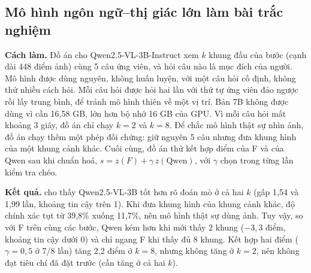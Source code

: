 \documentclass[a4paper,oneside]{report}
\begin{document}
\subsection{Mô hình ngôn ngữ--thị giác lớn làm bài trắc nghiệm}

\textbf{Cách làm.} Đồ án cho Qwen2.5-VL-3B-Instruct \citep{bai2025qwen25vl} xem $k$ khung đầu của bước (cạnh dài 448 điểm ảnh) cùng 5 câu ứng viên, và hỏi câu nào là mục đích của người. Mô hình được dùng nguyên, không huấn luyện, với một câu hỏi cố định, không thử nhiều cách hỏi. Mỗi câu hỏi được hỏi hai lần với thứ tự ứng viên đảo ngược rồi lấy trung bình, để tránh mô hình thiên về một vị trí. Bản 7B không được dùng vì cần 16,58 GB, lớn hơn bộ nhớ 16 GB của GPU. Vì mỗi câu hỏi mất khoảng 3 giây, đồ án chỉ chạy $k=2$ và $k=8$. Để chắc mô hình thật sự nhìn ảnh, đồ án chạy thêm một phép đối chứng: giữ nguyên 5 câu nhưng đưa khung hình của một khung cảnh khác. Cuối cùng, đồ án thử kết hợp điểm của F và của Qwen sau khi chuẩn hoá, $s=z(F)+\gamma\,z(\text{Qwen})$, với $\gamma$ chọn trong từng lần kiểm tra chéo.

\textbf{Kết quả.}  cho thấy Qwen2.5-VL-3B tốt hơn rõ đoán mò ở cả hai $k$ (gấp 1,54 và 1,99 lần, khoảng tin cậy trên 1). Khi đưa khung hình của khung cảnh khác, độ chính xác tụt từ 39,8\% xuống 11,7\%, nên mô hình thật sự dùng ảnh. Tuy vậy, so với F trên cùng các bước, Qwen kém hơn khi mới thấy 2 khung ($-3{,}3$ điểm, khoảng tin cậy dưới 0) và chỉ ngang F khi thấy đủ 8 khung. Kết hợp hai điểm ($\gamma=0{,}5$ ở 7/8 lần) tăng 2,2 điểm ở $k=8$, nhưng không tăng ở $k=2$, nên không đạt tiêu chí đã đặt trước (cần tăng ở cả hai $k$).

\begin{table}[ht]
\centering
\caption{Giai đoạn 8c: Qwen2.5-VL-3B làm bài trắc nghiệm 5 câu cùng video, so với F trên cùng 2.503 bước (đoán mò 20\%).}
\label{tab:stage8c}
\end{table}
\end{document}

